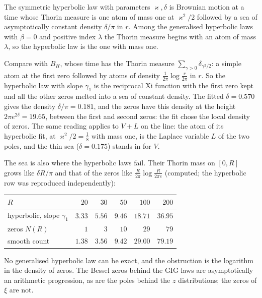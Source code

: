 \begin{corollary}\label{bn:cor:sea}
The symmetric hyperbolic law with parameters $\varkappa,\delta$ is Brownian motion at a time whose Thorin measure is one atom of mass one at $\varkappa^2/2$ followed by a sea of asymptotically constant density $\delta/\pi$ in $r$. Among the generalised hyperbolic laws with $\beta=0$ and positive index $\lambda$ the Thorin measure begins with an atom of mass $\lambda$, so the hyperbolic law is the one with mass one.
\end{corollary}
Compare with $B_H$, whose time has the Thorin measure $\sum_{\gamma>0}\delta_{\gamma^2/2}$: a simple atom at the first zero followed by atoms of density $\frac1{2\pi}\log\frac r{2\pi}$ in $r$. So the hyperbolic law with slope $\gamma_1$ is the reciprocal Xi function with the first zero kept and all the other zeros melted into a sea of constant density. The fitted $\delta=0.570$ gives the density $\delta/\pi=0.181$, and the zeros have this density at the height $2\pi e^{2\delta}=19.65$, between the first and second zeros: the fit chose the local density of zeros. The same reading applies to $V+L$ on the line: the atom of its hyperbolic fit, at $\varkappa^2/2=\frac18$ with mass one, is the Laplace variable $L$ of the two poles, and the thin sea ($\delta=0.175$) stands in for $V$.

The sea is also where the hyperbolic laws fail. Their Thorin mass on $[0,R]$ grows like $\delta R/\pi$ and that of the zeros like $\frac R{2\pi}\log\frac R{2\pi e}$ (computed; the hyperbolic row was reproduced independently):
\begin{center}
\small
\begin{tabular}{lrrrrr}
\toprule
$R$ & $20$ & $30$ & $50$ & $100$ & $200$\\
\midrule
hyperbolic, slope $\gamma_1$ & $3.33$ & $5.56$ & $9.46$ & $18.71$ & $36.95$\\
zeros $N(R)$ & $1$ & $3$ & $10$ & $29$ & $79$\\
smooth count & $1.38$ & $3.56$ & $9.42$ & $29.00$ & $79.19$\\
\bottomrule
\end{tabular}
\end{center}
No generalised hyperbolic law can be exact, and the obstruction is the logarithm in the density of zeros. The Bessel zeros behind the GIG laws are asymptotically an arithmetic progression, as are the poles behind the $z$ distributions; the zeros of $\xi$ are not.

